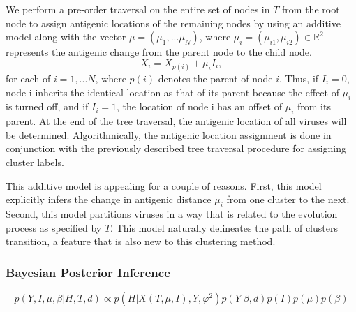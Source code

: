 \documentclass[11pt,oneside,letterpaper]{article}
\newcommand{\mdssd}{\varphi}						%
\begin{document}
We perform a pre-order traversal on the entire set of nodes in $T$  from the root node to assign antigenic locations of the remaining nodes by using an additive model along with the vector $\mu = (\mu_1,...\mu_N)$, where $\mu_i = (\mu_{i1},  \mu_{i2}) \in \mathbb{R}^{2}$ represents the antigenic change from the parent node to the child node.
\begin{equation}
	X_i=  X_{p(i)} + \mu_i    I_i   		,
\end{equation}
for each of $i=1,... N$, where $p(i)$ denotes the parent of node $i$.
Thus, if $I_i=0$, node i inherits the identical location as that of its parent because the effect of $\mu_i$ is turned off, and if $I_i=1$, the location of node i has an offset of $\mu_i$ from its parent.
At the end of the tree traversal, the antigenic location of all viruses will be determined.
Algorithmically, the antigenic location assignment is done in conjunction with the previously described tree traversal procedure for assigning cluster labels.



This additive model is appealing for a couple of reasons.
First, this model explicitly infers the change in antigenic distance $\mu_i$ from one cluster to the next.
Second, this model partitions viruses in a way that is related to the evolution process as specified by $T$.
This model naturally delineates the path of clusters transition, a feature that is also new to this clustering method.






\subsubsection*{Bayesian Posterior Inference}

\begin{equation}
  p(Y, I, \mu ,  \beta | H, T, d) \propto  p(H| X(T, \mu, I), Y , \mdssd^2) p(Y|  \beta, d) p(I) p(\mu) p(\beta)
\end{equation}
\end{document}
